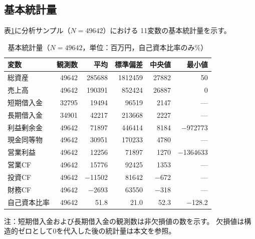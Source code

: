 \subsection{基本統計量}
\label{subsec:descriptive}

表\ref{tab:desc-stats}に分析サンプル（$N = \num{49642}$）における
11変数の基本統計量を示す。

\begin{table}[htbp]
  \centering
  \caption{基本統計量（$N = \num{49642}$，単位：百万円，自己資本比率のみ\%）}
  \label{tab:desc-stats}
  \begin{tabular}{lrrrrr}
    \toprule
    変数 & 観測数 & 平均 & 標準偏差 & 中央値 & 最小値 \\
    \midrule
    総資産       & \num{49642} & \num{285688}  & \num{1812459} & \num{27882} & 50 \\
    売上高       & \num{49642} & \num{190391}  & \num{852424}  & \num{26887} & 0 \\
    短期借入金   & \num{32795} & \num{19494}   & \num{96519}   & \num{2147}  & --- \\
    長期借入金   & \num{34901} & \num{42217}   & \num{213668}  & \num{2227}  & --- \\
    利益剰余金   & \num{49642} & \num{71897}   & \num{446414}  & \num{8184}  & $-$\num{972773} \\
    現金同等物   & \num{49642} & \num{30951}   & \num{170233}  & \num{4780}  & --- \\
    営業利益     & \num{49642} & \num{12256}   & \num{71897}   & \num{1270}  & $-$\num{1364633} \\
    営業CF      & \num{49642} & \num{15776}   & \num{92425}   & \num{1353}  & --- \\
    投資CF      & \num{49642} & $-$\num{11502} & \num{81642}  & $-$672      & --- \\
    財務CF      & \num{49642} & $-$\num{2693}  & \num{63550}  & $-$318      & --- \\
    自己資本比率 & \num{49642} & 51.8          & 21.0          & 52.3        & $-$128.2 \\
    \bottomrule
  \end{tabular}
  \begin{tablenotes}
    \small
    \item 注：短期借入金および長期借入金の観測数は非欠損値の数を示す。
    欠損値は構造的ゼロとして0を代入した後の統計量は本文を参照。
  \end{tablenotes}
\end{table}

